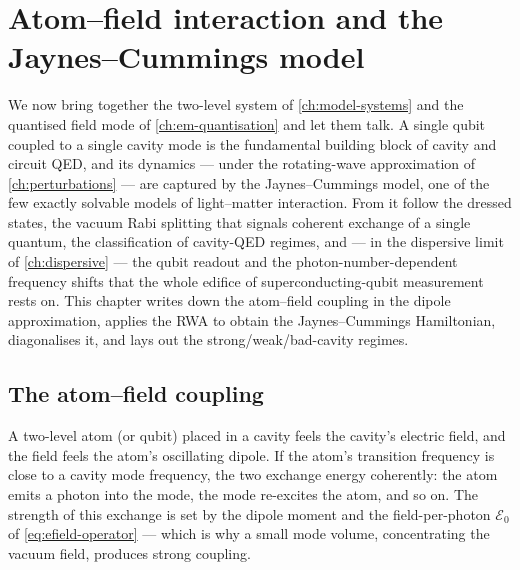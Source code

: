\chapter{Atom--field interaction and the Jaynes--Cummings model}
\label{ch:jaynes-cummings}

We now bring together the two-level system of \cref{ch:model-systems}
and the quantised field mode of \cref{ch:em-quantisation} and let
them talk. A single qubit coupled to a single cavity mode is the
fundamental building block of cavity and circuit QED, and its
dynamics --- under the rotating-wave approximation of
\cref{ch:perturbations} --- are captured by the Jaynes--Cummings
model, one of the few exactly solvable models of light--matter
interaction. From it follow the dressed states, the vacuum Rabi
splitting that signals coherent exchange of a single quantum, the
classification of cavity-QED regimes, and --- in the dispersive
limit of \cref{ch:dispersive} --- the qubit readout and the
photon-number-dependent frequency shifts that the whole edifice of
superconducting-qubit measurement rests on. This chapter writes
down the atom--field coupling in the dipole approximation, applies
the RWA to obtain the Jaynes--Cummings Hamiltonian, diagonalises it,
and lays out the strong/weak/bad-cavity regimes.

\section{The atom--field coupling}
\label{sec:atom-field}

\begin{phenomenon}
A two-level atom (or qubit) placed in a cavity feels the cavity's
electric field, and the field feels the atom's oscillating dipole.
If the atom's transition frequency is close to a cavity mode
frequency, the two exchange energy coherently: the atom emits a
photon into the mode, the mode re-excites the atom, and so on. The
strength of this exchange is set by the dipole moment and the
field-per-photon $\mathcal E_0$ of \cref{eq:efield-operator} ---
which is why a small mode volume, concentrating the vacuum field,
produces strong coupling.
\end{phenomenon}

